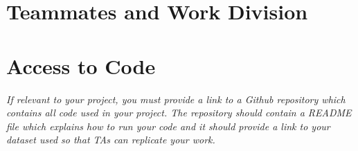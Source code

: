 \documentclass{article}
\begin{document}


\section{Teammates and Work Division}


\section{Access to Code}

\textit{If relevant to your project, you must provide a link to a Github repository which contains all code used in your project. The repository should contain a README file which explains how to run your code and it should provide a link to your dataset used so that TAs can replicate your work.}
\end{document}
